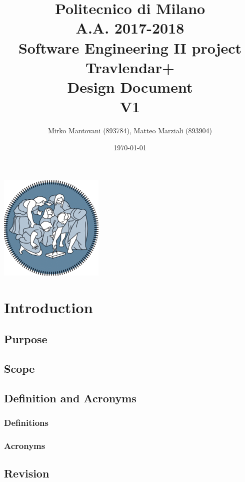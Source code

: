 \documentclass{article}
\author{Mirko Mantovani (893784), Matteo Marziali (893904)}
\date{\today}
\title{Politecnico di Milano
	\\A.A. 2017\@-\@2018
	\\Software Engineering II project \\ \textbf{Travlendar+}
	\\
	\textbf{D}esign \textbf{D}ocument 
	\\
	\textbf{V1}}
\begin{document}
\maketitle
\begin{center}
	\includegraphics[width=5cm]{polimi-logo}
\end{center}
\clearpage
{\hypersetup{hidelinks}\tableofcontents}
\clearpage

\section{Introduction}

\subsection{Purpose}



\newpage
\subsection{Scope}




\clearpage

\subsection{Definition and Acronyms}

\subsubsection{Definitions}


\subsubsection{Acronyms}



\subsection{Revision}

\end{document}

